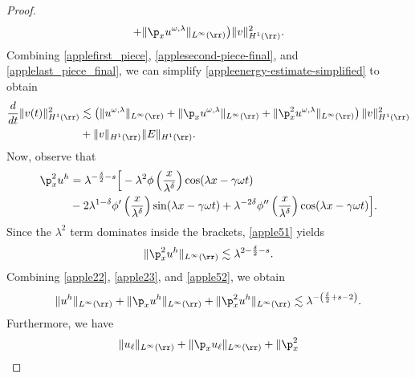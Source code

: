 \begin{proof}
\begin{equation}
\begin{split}
	 + \|\p_x u^{\omega,\lambda} \|_{L^\infty(\rr)} \big)
	\|v\|_{H^1(\rr)}^2.
\end{split}
\end{equation}
Combining \eqref{applefirst_piece}, \eqref{applesecond-piece-final},
and \eqref{applelast_piece_final}, we can
simplify \eqref{appleenergy-estimate-simplified} to obtain
\begin{equation}
	\begin{split}
		\label{appleenergy-estimate-best}
		\frac{d}{dt} \|v(t)\|_{H^1(\rr)}^2
		& \lesssim \left( \|u^{\omega,\lambda}\|_{L^\infty(\rr)} + \|
		\p_x u^{\omega,\lambda} \|_{L^\infty(\rr)} + \|\p_x^2 u^{\omega,\lambda} \|_{L^\infty (\rr)} \right)
		\|v\|_{H^1(\rr)}^2 
		\\
		&+ \|v\|_{H^1(\rr)} \|E\|_{H^1(\rr)}.
	\end{split}
\end{equation}
Now, observe that
\begin{equation}
	\begin{split}
		\p_x^2 u^h 
		& = \lambda^{-\frac{\delta}{2}-s} \Big[ - \lambda^2 \phi\left(
		\frac{x}{\lambda^\delta} \right ) \cos(\lambda x - \gamma \omega t) \\
		& - 2\lambda^{1 -\delta } \phi'\left( \frac{x}{\lambda^\delta}
		\right )
		\sin(\lambda x - \gamma \omega t ) + \lambda^{-2\delta} \phi''\left(
		\frac{x}{\lambda^\delta} \right) \cos (\lambda x - \gamma \omega t) \Big].
		\label{apple51}
	\end{split}
\end{equation}
Since the $\lambda^2$ term dominates inside the brackets, \eqref{apple51} yields
\begin{equation}
	\begin{split}
		\|\p_x^2 u^h \|_{L^\infty(\rr)} \lesssim
		\lambda^{2-\frac{\delta}{2}-s}.
		\label{apple52}
	\end{split}
\end{equation}
Combining \eqref{apple22}, \eqref{apple23}, and \eqref{apple52}, we obtain
\begin{equation}
	\begin{split}
		\|u^h\|_{L^\infty(\rr)} + \|\p_x u^h\|_{L^\infty(\rr)} + \|\p_x^2
		u^h\|_{L^\infty(\rr)} \lesssim \lambda^{-\left(
		\frac{\delta}{2} + s -2 \right)}.
		\label{apple53}
	\end{split}
\end{equation}
Furthermore, we have
\begin{equation}
	\begin{split}
		\|u_\ell\|_{L^\infty(\rr)} + \|\p_x u_\ell \|_{L^\infty(\rr)} + \|\p_x^2

\end{split}
\end{equation}
\end{proof}
